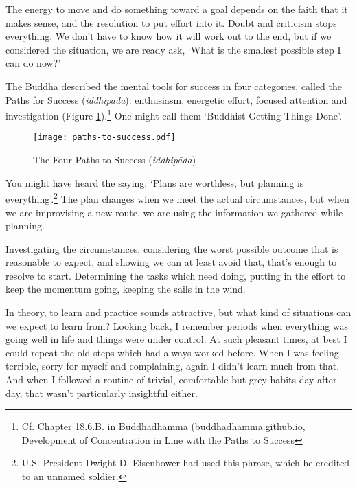 
The energy to move and do something toward a goal depends on the faith
that it makes sense, and the resolution to put effort into it. Doubt and
criticism stops everything. We don't have to know how it will work out
to the end, but if we considered the situation, we are ready ask, `What
is the smallest possible step I can do now?'

The Buddha described the mental tools for success in four categories,
called the Paths for Success (\emph{iddhipāda}): enthusiasm, energetic
effort, focused attention and investigation (Figure
\ref{fig-success}).\footnote{Cf.
  \href{https://buddhadhamma.github.io/path-factors-of-concentration.html\#development-of-concentration-in-line-with-the-paths-to-success}{Chapter
  18.6.B. in Buddhadhamma (buddhadhamma.github.io}, Development of
  Concentration in Line with the Paths to Success} One might call them
`Buddhist Getting Things Done'.

\clearpage
\null\vfill

\begin{figure}[h]
\caption{The Four Paths to Success (\emph{iddhipāda})}\label{fig-success}

\centering

\texttt{[image: paths-to-success.pdf]}

\end{figure}

\vfill\null
\clearpage


You might have heard the saying, `Plans are worthless, but planning is
everything'.\footnote{U.S. President Dwight D. Eisenhower had used this
  phrase, which he credited to an unnamed soldier.} The plan changes
when we meet the actual circumstances, but when we are improvising a new
route, we are using the information we gathered while planning.

Investigating the circumstances, considering the worst possible outcome
that is reasonable to expect, and showing we can at least avoid that,
that's enough to resolve to start. Determining the tasks which need
doing, putting in the effort to keep the momentum going, keeping the
sails in the wind.

In theory, to learn and practice sounds attractive, but what kind of
situations can we expect to learn from? Looking back, I remember periods
when everything was going well in life and things were under control. At
such pleasant times, at best I could repeat the old steps which had
always worked before. When I was feeling terrible, sorry for myself and
complaining, again I didn't learn much from that. And when I followed a
routine of trivial, comfortable but grey habits day after day, that
wasn't particularly insightful either.

